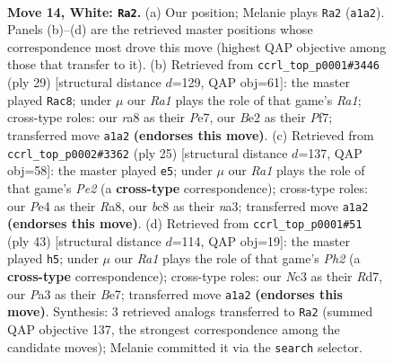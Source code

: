 \documentclass[11pt]{article}
\begin{document}
\clearpage

\begin{figure}[p]\centering
\begin{subfigure}{0.46\textwidth}\centering
\resizebox{\linewidth}{!}{%
\newchessgame
\chessboard[
  setfen={rnbr2k1/5pb1/2p2np1/1p2N1Bp/p3P3/P1N5/1PP1BPPP/R3RK2 w - - 0 14},
  showmover=false,
  pgfstyle=straightmove, color=movearrow, markmove={a1-a2}
]}
\caption{}
\end{subfigure}\hfill
\begin{subfigure}{0.46\textwidth}\centering
\resizebox{\linewidth}{!}{%
\newchessgame
\chessboard[
  setfen={r4rk1/pp2ppbp/6p1/3p4/2nPnBP1/3BPN1P/PP3P2/1R2K2R b K - 3 15},
  showmover=false,
  pgfstyle=straightmove, color=movearrow, markmove={a8-c8}
]}
\caption{}
\end{subfigure}
\\[4pt]
\begin{subfigure}{0.46\textwidth}\centering
\resizebox{\linewidth}{!}{%
\newchessgame
\chessboard[
  setfen={r2r2k1/pp2pp1p/2n3pb/2p4n/4PPb1/N1P1BNP1/PPB1K2P/R6R b - - 2 13},
  showmover=false,
  pgfstyle=straightmove, color=movearrow, markmove={e7-e5}
]}
\caption{}
\end{subfigure}\hfill
\begin{subfigure}{0.46\textwidth}\centering
\resizebox{\linewidth}{!}{%
\newchessgame
\chessboard[
  setfen={3r2k1/p2rbppp/1p6/3p1n2/N1n5/PNB1P1P1/1P3P1P/2RR2K1 b - - 0 22},
  showmover=false,
  pgfstyle=straightmove, color=movearrow, markmove={h7-h5}
]}
\caption{}
\end{subfigure}
\caption{\textbf{Move 14, White: \texttt{Ra2}.} (a) Our position; Melanie plays \texttt{Ra2} (\texttt{a1a2}). Panels (b)--(d) are the retrieved master positions whose correspondence most drove this move (highest QAP objective among those that transfer to it). (b) Retrieved from \texttt{ccrl\_top\_p0001\#3446} (ply 29) [structural distance $d$=129, QAP obj=61]: the master played \texttt{Rac8}; under $\mu$ our \emph{Ra1} plays the role of that game's \emph{Ra1}; cross-type roles: our \emph{r}a8 as their \emph{P}e7, our \emph{B}e2 as their \emph{P}f7; transferred move \texttt{a1a2} \textbf{(endorses this move)}. (c) Retrieved from \texttt{ccrl\_top\_p0002\#3362} (ply 25) [structural distance $d$=137, QAP obj=58]: the master played \texttt{e5}; under $\mu$ our \emph{Ra1} plays the role of that game's \emph{Pe2} (a \textbf{cross-type} correspondence); cross-type roles: our \emph{P}e4 as their \emph{R}a8, our \emph{b}c8 as their \emph{n}a3; transferred move \texttt{a1a2} \textbf{(endorses this move)}. (d) Retrieved from \texttt{ccrl\_top\_p0001\#51} (ply 43) [structural distance $d$=114, QAP obj=19]: the master played \texttt{h5}; under $\mu$ our \emph{Ra1} plays the role of that game's \emph{Ph2} (a \textbf{cross-type} correspondence); cross-type roles: our \emph{N}c3 as their \emph{R}d7, our \emph{P}a3 as their \emph{B}e7; transferred move \texttt{a1a2} \textbf{(endorses this move)}. Synthesis: 3 retrieved analogs transferred to \texttt{Ra2} (summed QAP objective 137, the strongest correspondence among the candidate moves); Melanie committed it via the \texttt{search} selector.}
\label{fig:thought-m26}
\end{figure}
\end{document}
